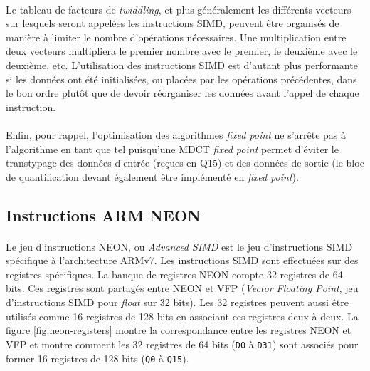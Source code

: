 \documentclass{article}
\begin{document}
    \paragraph{}
    Le tableau de facteurs de \emph{twiddling}, et plus généralement les différents vecteurs sur lesquels seront appelées les instructions SIMD, peuvent être organisés de manière à limiter le nombre d'opérations nécessaires. Une multiplication entre deux vecteurs multipliera le premier nombre avec le premier, le deuxième avec le deuxième, etc. L'utilisation des instructions SIMD est d'autant plus performante si les données ont été initialisées, ou placées par les opérations précédentes, dans le bon ordre plutôt que de devoir réorganiser les données avant l'appel de chaque instruction.

    \paragraph{}
    Enfin, pour rappel, l'optimisation des algorithmes \emph{fixed point} ne s'arrête pas à l'algorithme en tant que tel puisqu'une MDCT \emph{fixed point} permet d'éviter le transtypage des données d'entrée (reçues en Q15) et des données de sortie (le bloc de quantification devant également être implémenté en \emph{fixed point}).


    \subsection{Instructions ARM NEON}
    \paragraph{}
    Le jeu d'instructions NEON, ou \emph{Advanced SIMD} est le jeu d'instructions SIMD spécifique à l'architecture ARMv7. Les instructions SIMD sont effectuées sur des registres spécifiques. La banque de registres NEON compte 32 registres de 64 bits. Ces registres sont partagés entre NEON et VFP (\emph{Vector Floating Point}, jeu d'instructions SIMD pour \emph{float} sur 32 bits). Les 32 registres peuvent aussi être utilisés comme 16 registres de 128 bits en associant ces registres deux à deux\cite{DOC-ARM}. La figure \ref{fig:neon-registers} montre la correspondance entre les registres NEON et VFP et montre comment les 32 registres de 64 bits (\texttt{D0} à \texttt{D31}) sont associés pour former 16 registres de 128 bits (\texttt{Q0} à \texttt{Q15}).
\end{document}
